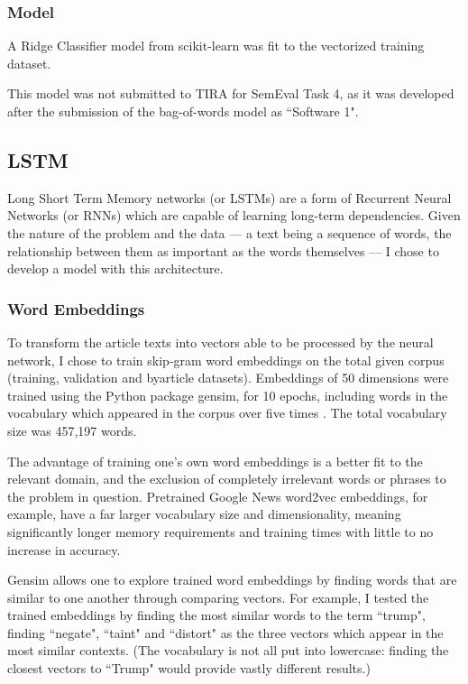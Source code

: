 \documentclass[11pt, a4paper]{article}
\begin{document}
\subsubsection{Model}

A Ridge Classifier model from scikit-learn was fit to the vectorized training dataset.

This model was not submitted to TIRA for SemEval Task 4, as it was developed after the submission of the bag-of-words model as ``Software 1".

\subsection{LSTM}

Long Short Term Memory networks (or LSTMs) are a form of Recurrent Neural Networks (or RNNs) which are capable of learning long-term dependencies. Given the nature of the problem and the data --- a text being a sequence of words, the relationship between them as important as the words themselves --- I chose to develop a model with this architecture.

\subsubsection{Word Embeddings}

To transform the article texts into vectors able to be processed by the neural network, I chose to train skip-gram word embeddings on the total given corpus (training, validation and byarticle datasets). Embeddings of 50 dimensions were trained using the Python package gensim, for 10 epochs, including words in the vocabulary which appeared in the corpus over five times \cite{rehurek_lrec}. The total vocabulary size was 457,197 words.

The advantage of training one's own word embeddings is a better fit to the relevant domain, and the exclusion of completely irrelevant words or phrases to the problem in question. Pretrained Google News word2vec embeddings, for example, have a far larger vocabulary size and dimensionality, meaning significantly longer memory requirements and training times with little to no increase in accuracy.

Gensim allows one to explore trained word embeddings by finding words that are similar to one another through comparing vectors. For example, I tested the trained embeddings by finding the most similar words to the term ``trump", finding ``negate", ``taint" and ``distort" as the three vectors which appear in the most similar contexts. (The vocabulary is not all put into lowercase: finding the closest vectors to ``Trump" would provide vastly different results.)
\end{document}
